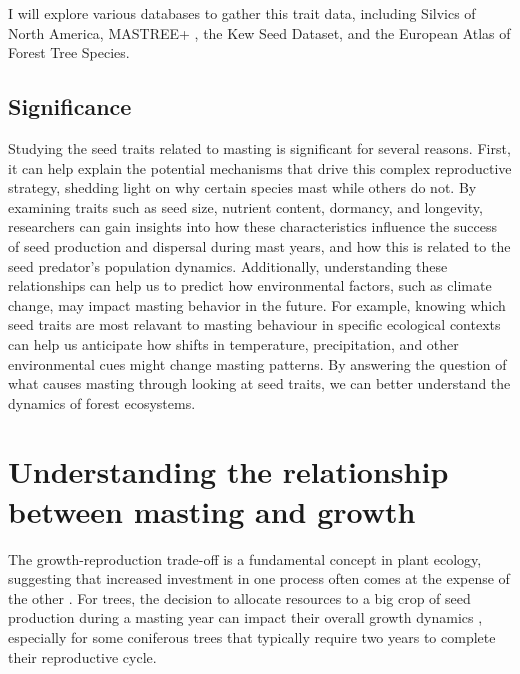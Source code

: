 \documentclass[11pt,letter]{article}
\begin{document}
I will explore various databases to gather this trait data, including Silvics of North America, MASTREE+ \citep{hacket2022mastree+}, the Kew Seed Dataset, and the European Atlas of Forest Tree Species.
\subsection{Significance} 
Studying the seed traits related to masting is significant for several reasons. First, it can help explain the potential mechanisms that drive this complex reproductive strategy, shedding light on why certain species mast while others do not. By examining traits such as seed size, nutrient content, dormancy, and longevity, researchers can gain insights into how these characteristics influence the success of seed production and dispersal during mast years, and how this is related to the seed predator's population dynamics.
Additionally, understanding these relationships can help us to predict how environmental factors, such as climate change, may impact masting behavior in the future. For example, knowing which seed traits are most relavant to masting behaviour in specific ecological contexts can help us anticipate how shifts in temperature, precipitation, and other environmental cues might change masting patterns. By answering the question of what causes masting through looking at seed traits, we can better understand the dynamics of forest ecosystems.

\section{Understanding the relationship between masting and growth}
The growth-reproduction trade-off is a fundamental concept in plant ecology, suggesting that increased investment in one process often comes at the expense of the other \citep{stearns1998evolution}. For trees, the decision to allocate resources to a big crop of seed production during a masting year can impact their overall growth dynamics \citep{hacket2016tree}, especially for some coniferous trees that typically require two years to complete their reproductive cycle.
\end{document}
